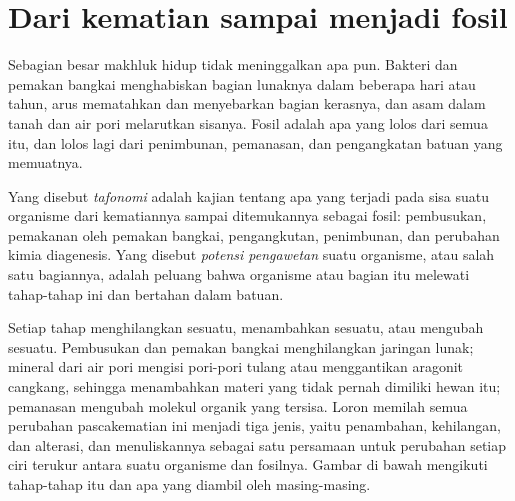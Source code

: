 \section{Dari kematian sampai menjadi fosil}\label{sec:b2:palaeoenvironments:taphonomy}

Sebagian besar makhluk hidup tidak meninggalkan apa pun. Bakteri dan pemakan bangkai menghabiskan bagian lunaknya dalam
beberapa hari atau tahun, arus mematahkan dan menyebarkan bagian kerasnya, dan asam dalam tanah dan air pori
melarutkan sisanya. Fosil adalah apa yang lolos dari semua itu, dan lolos lagi dari penimbunan,
pemanasan, dan pengangkatan batuan yang memuatnya.

\begin{definition}\label{def:b2:palaeoenvironments:taphonomy}
Yang disebut \emph{tafonomi} adalah kajian tentang apa yang terjadi pada sisa suatu organisme
dari kematiannya sampai ditemukannya sebagai fosil: pembusukan, pemakanan oleh pemakan bangkai, pengangkutan, penimbunan, dan
perubahan kimia diagenesis. Yang disebut \emph{potensi pengawetan}
suatu organisme, atau salah satu bagiannya, adalah peluang bahwa organisme atau bagian itu melewati tahap-tahap ini
dan bertahan dalam batuan.
\end{definition}

Setiap tahap menghilangkan sesuatu, menambahkan sesuatu, atau mengubah sesuatu. Pembusukan dan pemakan bangkai menghilangkan
jaringan lunak; mineral dari air pori mengisi pori-pori tulang atau menggantikan aragonit
cangkang, sehingga menambahkan materi yang tidak pernah dimiliki hewan itu; pemanasan mengubah molekul organik yang tersisa.
Loron memilah semua perubahan pascakematian ini menjadi tiga jenis, yaitu penambahan, kehilangan, dan alterasi, dan
menuliskannya sebagai satu persamaan untuk perubahan setiap ciri terukur antara suatu organisme dan
fosilnya. Gambar di bawah mengikuti tahap-tahap itu dan apa yang diambil oleh masing-masing.

